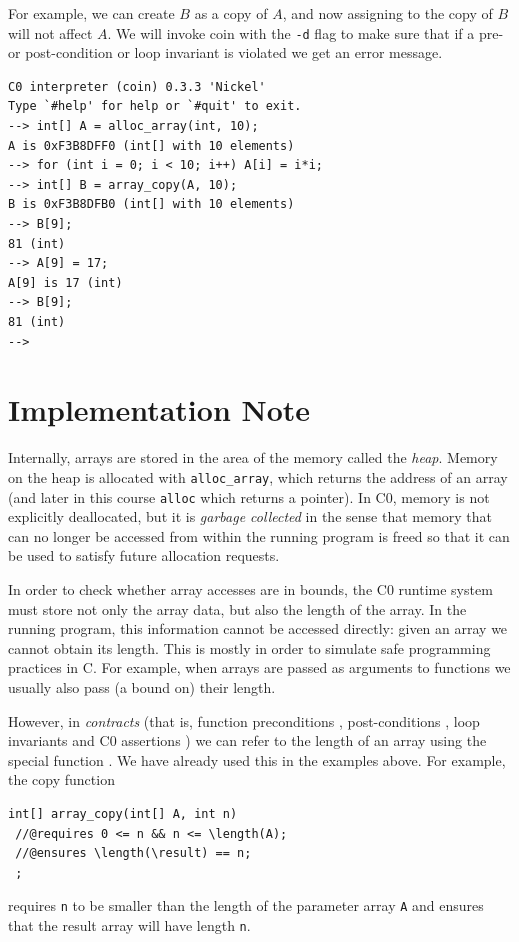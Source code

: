 \noindent
For example, we can create $B$ as a copy of $A$, and now assigning to
the copy of $B$ will not affect $A$.  We will invoke coin with the
\lstinline'-d' flag to make sure that if a pre- or post-condition or
loop invariant is violated we get an error message.

\begin{lstlisting}[language={[coin]C}]
% coin copy.c0 -d
C0 interpreter (coin) 0.3.3 'Nickel'
Type `#help' for help or `#quit' to exit.
--> int[] A = alloc_array(int, 10);
A is 0xF3B8DFF0 (int[] with 10 elements)
--> for (int i = 0; i < 10; i++) A[i] = i*i;
--> int[] B = array_copy(A, 10);
B is 0xF3B8DFB0 (int[] with 10 elements)
--> B[9];
81 (int)
--> A[9] = 17;
A[9] is 17 (int)
--> B[9];
81 (int)
-->
\end{lstlisting}


\section{Implementation Note}
\label{sec:arrays:implement}

Internally, arrays are stored in the area of the memory called the
\emph{heap}.  Memory on the heap is allocated with
\lstinline'alloc_array', which returns the address of an array (and
later in this course \lstinline'alloc' which returns a pointer).  In
C0, memory is not explicitly deallocated, but it is \emph{garbage
  collected} in the sense that memory that can no longer be accessed
from within the running program is freed so that it can be used to
satisfy future allocation requests.

In order to check whether array accesses are in bounds, the C0 runtime
system must store not only the array data, but also the length of the
array.  In the running program, this information cannot be accessed
directly: given an array we cannot obtain its length.  This is mostly
in order to simulate safe programming practices in C.  For example,
when arrays are passed as arguments to functions we usually also pass
(a bound on) their length.

However, in \emph{contracts} (that is, function preconditions
\requires{}, post-conditions \ensures{}, loop invariants
\loopinvariant{} and C0 assertions \assert{}) we can refer to the
length of an array using the special function \length{}.  We have
already used this in the examples above.  For example, the copy
function

\begin{lstlisting}[language={[C0]C}]
int[] array_copy(int[] A, int n)
 //@requires 0 <= n && n <= \length(A);
 //@ensures \length(\result) == n;
 ;
\end{lstlisting}
requires \lstinline'n' to be smaller than the length of the parameter
array \lstinline'A' and ensures that the result array will have length
\lstinline'n'.


